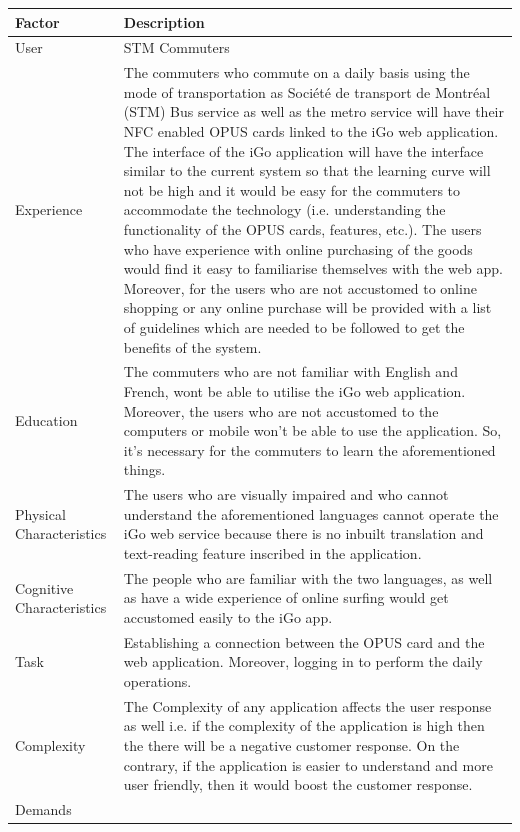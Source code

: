 \documentclass[11pt, english]{report}
\begin{document}
\setlength{\tabcolsep}{18pt}
\renewcommand{\arraystretch}{1.5}
\begin{longtable}[!htbp]{ |p{3cm}|p{12cm}| }
\hline
Factor   & Description  \\
\hline

User &  STM Commuters \\
\hline
Experience & 


The commuters who commute on a daily basis using the mode of transportation as Société de transport de Montréal (STM) Bus service as well as the metro service will have their NFC enabled OPUS cards linked to the iGo web application. The interface of the iGo application will have the interface similar to the current system so that the learning curve will not be high and it would be easy for the commuters to accommodate the technology (i.e. understanding the functionality of the OPUS cards, features, etc.). The users who have experience with online purchasing of the goods would find it easy to familiarise themselves with the web app. Moreover, for the users who are not accustomed to online shopping or any online purchase will be provided with a list of guidelines which are needed to be followed to get the benefits of the system.

    \\
\hline
Education &

The commuters who are not familiar with English and French, wont be able to utilise the iGo web application. Moreover, the users who are not accustomed to the computers or mobile won't be able to use the application. So, it's necessary for the commuters to learn the aforementioned things.

 \\
 \hline
Physical Characteristics    &
The users who are visually impaired and who cannot understand the aforementioned languages cannot operate the iGo web service because there is no inbuilt translation and text-reading feature inscribed in the application.
  \\
  \hline
Cognitive Characteristics & 

The people who are familiar with the two languages, as well as have a wide experience of online surfing would get accustomed easily to the iGo app.
  \\
 \hline
Task &  Establishing a connection between the OPUS card and the web application. Moreover, logging in to perform the daily operations.\\
\hline
Complexity &

The Complexity of any application affects the user response as well i.e. if the complexity of the application is high then the there will be a negative customer response. On the contrary, if the application is easier to understand and more user friendly, then it would boost the customer response.
  \\
\hline
Demands &


\end{longtable}
\end{document}
